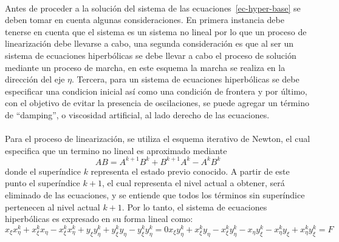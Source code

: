 \documentclass[letterpaper, openright, 12pt]{book}
\begin{document}
    \paragraph*{}
    Antes de proceder a la solución del sistema de las
    ecuaciones~\ref{ec-hyper-base} se deben tomar en cuenta algunas
    consideraciones. En primera instancia debe tenerse en cuenta que el sistema
    es un sistema no lineal por lo que un proceso de linearización debe llevarse
    a cabo, una segunda consideración es que al ser un sistema de ecuaciones
    hiperbólicas se debe llevar a cabo el proceso de solución mediante un
    proceso de marcha, en este esquema la marcha se realiza en la dirección del
    eje $\eta$. Tercera, para un sistema de ecuaciones hiperbólicas se debe
    especificar una condicion inicial así como una condición de frontera y por
    último, con el objetivo de evitar la presencia de oscilaciones, se puede
    agregar un término de ``damping'', o viscosidad artificial, al lado derecho
    de las ecuaciones.

    \paragraph*{}
    Para el proceso de linearización, se utiliza el esquema iterativo de
    Newton, el cual especifica que un termino no lineal es aproximado
    mediante
    \begin{equation}
        AB = A^{k + 1} B^{k} + B^{k + 1} A^{k} - A^{k} B^{k}
    \end{equation}
    donde el superíndice $k$ representa el estado previo conocido. A partir
    de este punto el superíndice $k + 1$, el cual representa el nivel actual
    a obtener, será eliminado de las ecuaciones, y se entiende que todos los
    términos sin superíndice pertenecen al nivel actual $k + 1$. Por lo
    tanto, el sistema de ecuaciones hiperbólicas es expresado en su forma
    lineal como:
    \begin{subequations}
        \begin{equation}
            x_{\xi} x_{\eta}^{k} + x_{\xi}^{k} x_{\eta}
            - x_{\xi}^{k} x_{\eta}^{k} + y_{\xi} y_{\eta}^{k}
            + y_{\xi}^{k} y_{\eta} - y_{\xi}^{k} y_{\eta}^{k} = 0
        \end{equation}
        \begin{equation}
            x_{\xi} y_{\eta}^{k} + x_{\xi}^{k} y_{\eta}
            - x_{\xi}^{k} y_{\eta}^{k} - x_{\eta} y_{\xi}^{k}
            - x_{\eta}^{k} y_{\xi} + x_{\eta}^{k} y_{\xi}^{k} = F
        \end{equation}
        \label{ec-hyper-linear}
    \end{subequations}
\end{document}
